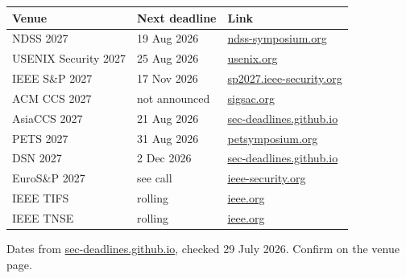 \documentclass[aspectratio=169,11pt]{beamer}
\begin{document}
\begin{frame}
  \begin{center}
  \footnotesize
  \begin{tabular}{@{}p{5.3cm}p{3.1cm}p{4.3cm}@{}}
    \toprule
    \textbf{Venue} & \textbf{Next deadline} & \textbf{Link}\\
    \midrule
    NDSS 2027                & 19 Aug 2026 & \href{https://www.ndss-symposium.org/}{ndss-symposium.org}\\
    USENIX Security 2027     & 25 Aug 2026 & \href{https://www.usenix.org/conference/usenixsecurity27}{usenix.org}\\
    IEEE S\&P 2027           & 17 Nov 2026 & \href{https://sp2027.ieee-security.org/}{sp2027.ieee-security.org}\\
    ACM CCS 2027             & not announced & \href{https://www.sigsac.org/ccs/CCS2027/}{sigsac.org}\\
    \addlinespace[0.9em]
    \midrule
    \addlinespace[0.2em]
    AsiaCCS 2027             & 21 Aug 2026 & \href{https://sec-deadlines.github.io/}{sec-deadlines.github.io}\\
    PETS 2027                & 31 Aug 2026 & \href{https://petsymposium.org/cfp27.php}{petsymposium.org}\\
    DSN 2027                 & 2 Dec 2026  & \href{https://sec-deadlines.github.io/}{sec-deadlines.github.io}\\
    EuroS\&P 2027            & see call    & \href{https://www.ieee-security.org/Calendar/cfps/cfp-EuroSnP2027.html}{ieee-security.org}\\
    \addlinespace[0.9em]
    \midrule
    \addlinespace[0.2em]
    IEEE TIFS                & rolling & \href{https://www.comsoc.org/publications/journals/ieee-tifs}{ieee.org}\\
    IEEE TNSE  & rolling & \href{https://www.computer.org/csdl/journal/na}{ieee.org}\\
    \bottomrule
  \end{tabular}
  \end{center}
  \vspace{0.3em}
  {\tiny Dates from \href{https://sec-deadlines.github.io/}{sec-deadlines.github.io}, checked 29 July 2026. Confirm on the venue page.}
\end{frame}
\end{document}
